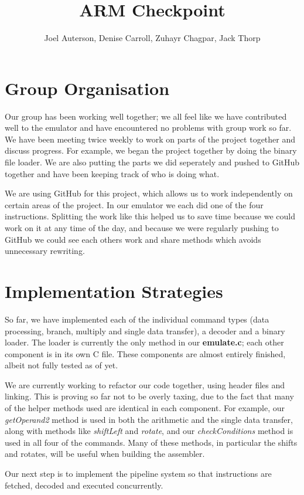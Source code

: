 \documentclass[11pt]{article}
\begin{document}
\title{ARM Checkpoint}
\author{Joel Auterson, Denise Carroll, Zuhayr Chagpar, Jack Thorp}

\maketitle

\section{Group Organisation}

Our group has been working well together; we all feel like we have contributed well to the emulator and have encountered no problems with group work so far. We have been meeting twice weekly to work on parts of the project together and discuss progress. For example, we began the project together by doing the binary file loader. We are also putting the parts we did seperately and pushed to GitHub together and have been keeping track of who is doing what.

We are using GitHub for this project, which allows us to work independently on certain areas of the project. In our emulator we each did one of the four instructions. Splitting the work like this helped us to save time because we could work on it at any time of the day, and because we were regularly pushing to GitHub we could see each others work and share methods which avoids unnecessary rewriting.

\section{Implementation Strategies}

So far, we have implemented each of the individual command types (data processing, branch, multiply and single data transfer), a decoder and a binary loader. The loader is currently the only method in our {\bf emulate.c}; each other component is in its own C file. These components are almost entirely finished, albeit not fully tested as of yet.

We are currently working to refactor our code together, using header files and linking. This is proving so far not to be overly taxing, due to the fact that many of the helper methods used are identical in each component. For example, our {\it getOperand2} method is used in both the arithmetic and the single data transfer, along with methods like {\it shiftLeft} and {\it rotate}, and our {\it checkConditions} method is used in all four of the commands. Many of these methods, in particular the shifts and rotates, will be useful when building the assembler.

Our next step is to implement the pipeline system so that instructions are fetched, decoded and executed concurrently.
\end{document}

